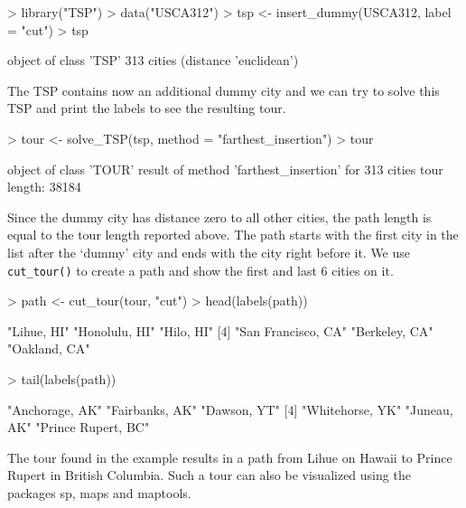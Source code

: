 \documentclass[10pt,a4paper,fleqn]{article}
\newcommand{\strong}[1]{{\normalfont\fontseries{b}\selectfont #1}}
\newcommand{\func}[1]{\mbox{\texttt{#1()}}}
\newcommand{\pkg}[1]{\strong{#1}}
\begin{document}
\begin{Schunk}
\begin{Sinput}
> library("TSP")
> data("USCA312")
> tsp <- insert_dummy(USCA312, label = "cut")
> tsp
\end{Sinput}
\begin{Soutput}
object of class 'TSP' 
313 cities (distance 'euclidean') 
\end{Soutput}
\end{Schunk}

The TSP contains now an additional dummy city and we can try to solve this
TSP and print the labels to see the resulting tour.

\begin{Schunk}
\begin{Sinput}
> tour <- solve_TSP(tsp, method = "farthest_insertion")
> tour
\end{Sinput}
\begin{Soutput}
object of class 'TOUR' 
result of method 'farthest_insertion' for 313 cities
tour length: 38184 
\end{Soutput}
\end{Schunk}

Since the dummy city has distance zero to all other cities, the path length is
equal to the tour length reported above. The path starts with the first city in
the list after the `dummy' city  and ends with the city right before it. 
We use \func{cut\_tour} to create a path and show the 
first and last 6 cities on it.

\begin{Schunk}
\begin{Sinput}
> path <- cut_tour(tour, "cut")
> head(labels(path))
\end{Sinput}
\begin{Soutput}
[1] "Lihue, HI"         "Honolulu, HI"      "Hilo, HI"         
[4] "San Francisco, CA" "Berkeley, CA"      "Oakland, CA"      
\end{Soutput}
\begin{Sinput}
> tail(labels(path))
\end{Sinput}
\begin{Soutput}
[1] "Anchorage, AK"     "Fairbanks, AK"     "Dawson, YT"       
[4] "Whitehorse, YK"    "Juneau, AK"        "Prince Rupert, BC"
\end{Soutput}
\end{Schunk}

The tour found in the example results in a path from Lihue on Hawaii to Prince
Rupert in British Columbia. Such a tour can also be visualized using the
packages \pkg{sp}, \pkg{maps} and \pkg{maptools}.
\end{document}

